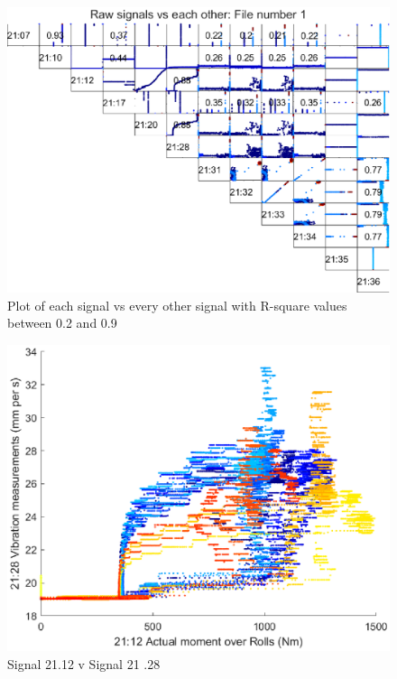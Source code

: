 \documentclass[]{article}
\begin{document}
\begin{center}
\begin{scriptsize}
 
\end{scriptsize}
\label{correlationTable}
\end{center}

\begin{figure}[H]
    \centering
    \includegraphics[width=\textwidth, height=\textheight, keepaspectratio]{figures/RawSignalCorrelationsFile1.eps}
    \caption{Plot of each signal vs every other signal with R-square values between 0.2 and 0.9}
    \label{fig:RawSignalCorrelationsFile1}
\end{figure}

\begin{figure}[H]
    \centering
    \includegraphics[width=\textwidth, height=\textheight, keepaspectratio]{figures/Signal21_12vSignal21_28.eps}
    \caption{Signal 21.12 v Signal 21 .28}
    \label{fig:Signal21_12vSignal21_28}
\end{figure}
\end{document}
